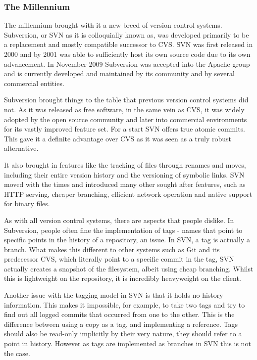 \subsubsection{The Millennium}
The millennium brought with it a new breed of version control systems.
Subversion, or SVN as it is colloquially known as, was developed primarily to be a replacement and mostly compatible successor to CVS.
SVN was first released in 2000 and by 2001 was able to sufficiently host its own source code due to its own advancement.
In November 2009 Subversion was accepted into the Apache group and is currently developed and maintained by its community and by several commercial entities.

Subversion brought things to the table that previous version control systems did not.
As it was released as free software, in the same vein as CVS, it was widely adopted by the open source community and later into commercial environments for its vastly improved feature set.
For a start SVN offers true atomic commits.
This gave it a definite advantage over CVS as it was seen as a truly robust alternative.

It also brought in features like the tracking of files through renames and moves, including their entire version history and the versioning of symbolic links.
SVN moved with the times and introduced many other sought after features, such as HTTP serving, cheaper branching, efficient network operation and native support for binary files.

As with all version control systems, there are aspects that people dislike.
In Subversion, people often fine the implementation of tags - names that point to specific points in the history of a repository, an issue.
In SVN, a tag is actually a branch.
What makes this different to other systems such as Git and its predecessor CVS, which literally point to a specific commit in the tag, SVN actually creates a snapshot of the filesystem, albeit using cheap branching.
Whilst this is lightweight on the repository, it is incredibly heavyweight on the client.

Another issue with the tagging model in SVN is that it holds no history information.
This makes it impossible, for example, to take two tags and try to find out all logged commits that occurred from one to the other.
This is the difference between using a copy as a tag, and implementing a reference.
Tags should also be read-only implicitly by their very nature, they should refer to a point in history.
However as tags are implemented as branches in SVN this is not the case.

